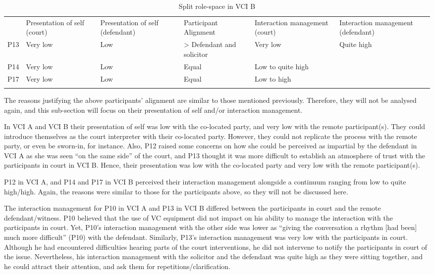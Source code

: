 \documentclass[output=paper]{langsci/langscibook}
\begin{document}
\begin{table}
\begin{tabularx}{\textwidth}{XXXXXX}
\lsptoprule
& {Presentation of self (court)} & {Presentation of self (defendant)} & {Participant Alignment} & \multicolumn{1}{X}{{Interaction management (court)}} & {Interaction management (defendant)}\\

P13 & Very low & Low & > Defendant and solicitor & \multicolumn{1}{X}{Very low} & Quite high\\
P14 & Very low & Low & Equal & \multicolumn{2}{X}{Low to quite high} \\
P17 & Very low & Low & Equal & \multicolumn{2}{X}{Low to high}\\
\lspbottomrule
\end{tabularx}

\caption{Split role-space in VCI B\label{tab:devaux:5}}
\end{table}

The reasons justifying the above participants’ alignment are similar to those mentioned previously. Therefore, they will not be analysed again, and this sub-section will focus on their presentation of self and/or interaction management.

In VCI A and VCI B their presentation of self was low with the co-located party, and very low with the remote participant(s). They could introduce themselves as the court interpreter with their co-located party. However, they could not replicate the process with the remote party, or even be sworn-in, for instance. Also, P12 raised some concerns on how she could be perceived as impartial by the defendant in VCI A as she was seen “on the same side” of the court, and P13 thought it was more difficult to establish an atmosphere of trust with the participants in court in VCI B. Hence, their presentation was low with the co-located party and very low with the remote participant(s).

P12 in VCI A, and P14 and P17 in VCI B perceived their interaction management alongside a continuum ranging from low to quite high/high. Again, the reasons were similar to those for the participants above, so they will not be discussed here. 

The interaction management for P10 in VCI A and P13 in VCI B differed between the participants in court and the remote defendant/witness. P10 believed that the use of VC equipment did not impact on his ability to manage the interaction with the participants in court. Yet, P10’s interaction management with the other side was lower as “giving the conversation a rhythm [had been] much more difficult” (P10) with the defendant. Similarly, P13’s interaction management was very low with the participants in court. Although he had encountered difficulties hearing parts of the court interventions, he did not intervene to notify the participants in court of the issue. Nevertheless, his interaction management with the solicitor and the defendant was quite high as they were sitting together, and he could attract their attention, and ask them for repetitions/clarification.
\end{document}
